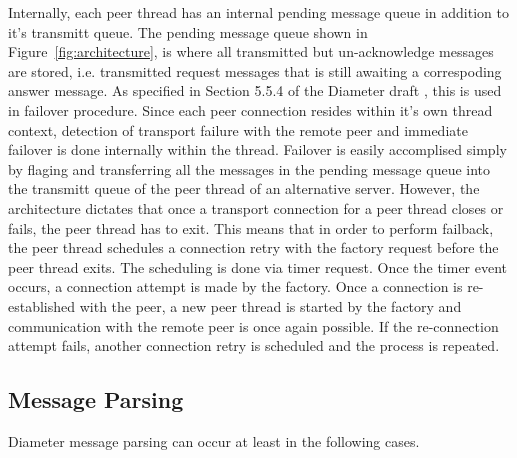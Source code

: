 \documentclass{article}
\begin{document}
Internally, each peer thread has an internal pending message queue in
addition to it's transmitt queue. The pending message queue shown in
Figure~\ref{fig:architecture}, is where all transmitted but
un-acknowledge messages are stored, i.e. transmitted request messages
that is still awaiting a correspoding answer message. As specified in
Section 5.5.4 of the Diameter draft \cite{basep}, this is used in
failover procedure. Since each peer connection resides within it's own
thread context, detection of transport failure with the remote peer and
immediate failover is done internally within the thread. Failover is
easily accomplised simply by flaging and transferring all the messages
in the pending message queue into the transmitt queue of the peer thread
of an alternative server. However, the architecture dictates that once a
transport connection for a peer thread closes or fails, the peer thread
has to exit. This means that in order to perform failback, the peer
thread schedules a connection retry with the factory request before the
peer thread exits. The scheduling is done via timer request. Once the
timer event occurs, a connection attempt is made by the factory. Once a
connection is re-established with the peer, a new peer thread is started
by the factory and communication with the remote peer is once again
possible. If the re-connection attempt fails, another connection retry
is scheduled and the process is repeated.

\subsection{Message Parsing\label{sec:msgparsing}}

Diameter message parsing can occur at least in the following cases.
\end{document}
